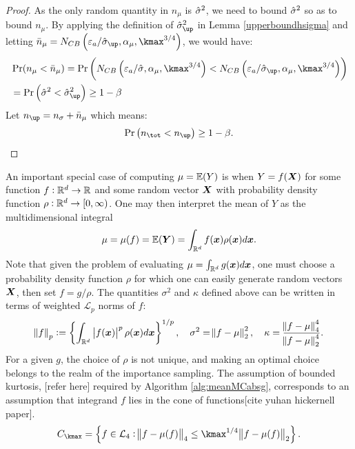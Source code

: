 \documentclass{iitthesis}
\begin{document}
\begin{proof}
As the only random quantity in $n_\mu$ is $\hat{\sigma}^2$, we need to bound $\hat{\sigma}^2$ so as  to bound $n_{\mu}$.
 By applying the definition of $\hsigma_{\up}^2$ in Lemma \ref{upperboundhsigma} and letting $\bar{n}_{\mu} = N_{CB}\left(\varepsilon_a/\hsigma_{\up},\alpha_\mu, \kmax^{3/4}\right)$, we would have:
\begin{align}
& \Pr(n_{\mu} < \bar{n}_{\mu})  = \Pr\left (N_{CB}\left(\varepsilon_a/\hsigma,\alpha_\mu, \kmax^{3/4}\right) < N_{CB}\left(\varepsilon_a/\hsigma_{\up},\alpha_\mu, \kmax^{3/4}\right) \right)\\&
 = \Pr \left(\hsigma^2 < \hsigma_{\up}^2 \right) \geq 1-\beta
\end{align}
Let $n_{\up} =n_\sigma+\bar{n}_{\mu} $
which means:
\begin{align}
\Pr \left(n_{\tot} < n_{\up}\right)  \geq 1-\beta.
\end{align}
\end{proof}
An important special case of computing $\mu =\mathbb{E}(Y)$ is when $Y = f(\boldsymbol{X})$ for some function $f:\mathbb{R}^d \to \mathbb{R}$ and some random vector $\boldsymbol{X}$ with probability density function $\rho: \mathbb{R}^d \to [0,\infty)$. One may then interpret the mean of $Y$ as the multidimensional integral
\begin{align*}
\mu = \mu(f) = \mathbb{E}(\boldsymbol{Y}) = \int_{\mathbb{R}^d}f(\boldsymbol{x})\rho(\boldsymbol{x})d\boldsymbol{x}.
\end{align*}
Note that given the problem of evaluating $\mu = \int_{\mathbb{R}^d}g(\boldsymbol{x})d\boldsymbol{x}$, one must choose a probability density function $\rho$ for which one can easily generate random vectors $\boldsymbol{X}$, then set $f = g/\rho$. The quantities $\sigma^2$ and $\kappa$ defined above can be written in terms of weighted $\mathcal{L}_p$ norms of $f$:
\begin{align}
\norm{f}_p:=\left\{ \int_{\mathbb{R}^d}\left \lvert f(\boldsymbol{x}) \right \rvert^p\rho(\boldsymbol{x})d\boldsymbol{x}\right\}^{1/p}, \quad \sigma^2 = \norm{f-\mu}_2^2,\quad \kappa = \frac{\norm{f-\mu}_4^4}{\norm{f-\mu}_2^4}.
\end{align}
For a given $g$, the choice of $\rho$ is not unique, and making an optimal choice belongs to the realm of the importance sampling. The assumption of bounded kurtosis, [refer here] required by Algorithm \ref{alg:meanMCabsg}, corresponds to an assumption that integrand $f$ lies in the cone of functions[cite yuhan hickernell paper].
\begin{align}
C_{\kmax} = \left\{ f \in \mathcal{L}_4: \norm{f-\mu(f)}_4 \leq \kmax^{1/4} \norm{f-\mu(f)}_2\right\}.
\end{align}
\end{document}
